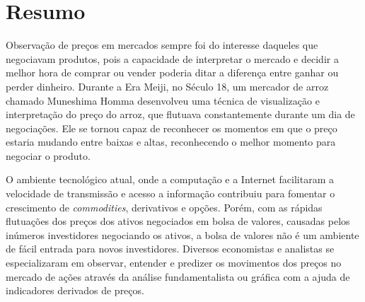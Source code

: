 \documentclass[12pt]{article}
\begin{document}
 



\pagestyle{empty}

{}
\section*{Resumo}


Observação de preços em mercados sempre foi do interesse daqueles que negociavam produtos,
pois a capacidade de interpretar o mercado e decidir a melhor hora de comprar ou vender
poderia ditar a diferença entre ganhar ou perder dinheiro. Durante a Era Meiji, no Século 18,
um mercador de arroz chamado Muneshima Homma desenvolveu uma técnica de visualização e
interpretação do preço do arroz, que flutuava constantemente durante um dia de negociações.
Ele se tornou capaz de reconhecer os momentos em que o preço estaria mudando entre baixas e
altas, reconhecendo o melhor momento para negociar o produto.


O ambiente tecnológico atual, onde a computação e a Internet facilitaram a velocidade de
transmissão e acesso a informação contribuiu para fomentar o crescimento de 
\textit{commodities}, derivativos e opções.
Porém, com as rápidas flutuações dos preços dos ativos negociados em bolsa de valores,
causadas pelos inúmeros investidores negociando os ativos, a bolsa de valores não é um
ambiente de fácil entrada para novos investidores.
Diversos economistas e analistas se especializaram em observar, entender e predizer os
movimentos dos preços no mercado de ações através da análise fundamentalista ou gráfica
com a ajuda de indicadores derivados de preços.
\end{document}
